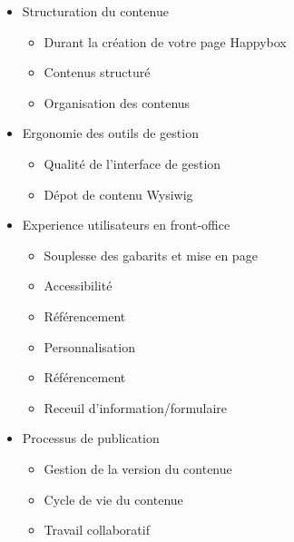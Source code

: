 \documentclass[11pt, a4paper ]{article}
\begin{document}
\begin{itemize}
	\item Structuration du contenue

		\begin{itemize}
			\item Durant la création de votre page Happybox

			\item Contenus structuré

			\item Organisation des contenus

		\end{itemize}

	\item Ergonomie des outils de gestion

		\begin{itemize}
			\item Qualité de l'interface de gestion

			\item Dépot de contenu Wysiwig

		\end{itemize}

	\item Experience utilisateurs en front-office
		\begin{itemize}
			\item Souplesse des gabarits et mise en page

			\item Accessibilité

			\item Référencement

			\item Personnalisation

			\item Référencement

			\item Receuil d'information/formulaire

		\end{itemize}

	\item Processus de publication
		\begin{itemize}
			\item Gestion de la version du contenue

			\item Cycle de vie du contenue

			\item Travail collaboratif

		\end{itemize}


\end{itemize}
\end{document}
